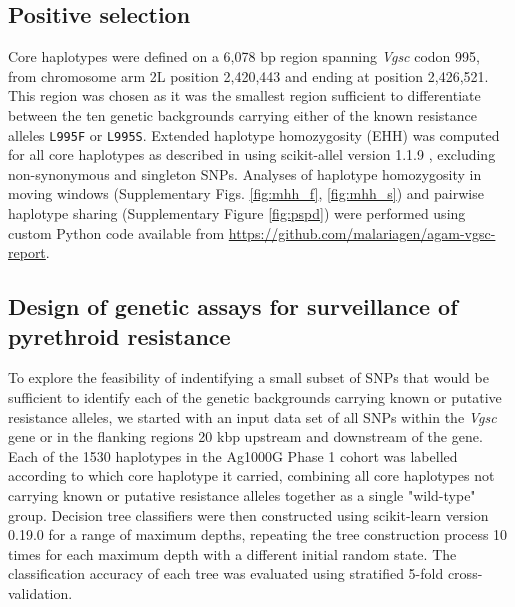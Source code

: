 \documentclass[a4paper,11pt,abstracton,hidelinks]{scrartcl}
\begin{document}
\subsection*{Positive selection}

Core haplotypes were defined on a 6,078 bp region spanning \textit{Vgsc} codon 995, from chromosome arm 2L position 2,420,443 and ending at position 2,426,521.
%
This region was chosen as it was the smallest region sufficient to differentiate between the ten genetic backgrounds carrying either of the known resistance alleles \texttt{L995F} or \texttt{L995S}.
%
Extended haplotype homozygosity (EHH) was computed for all core haplotypes as described in \cite{Sabeti2002} using scikit-allel version 1.1.9 \cite{Miles2016}, excluding non-synonymous and singleton SNPs.
%
Analyses of haplotype homozygosity in moving windows (Supplementary Figs. \ref{fig:mhh_f}, \ref{fig:mhh_s}) and pairwise haplotype sharing (Supplementary Figure \ref{fig:pspd}) were performed using custom Python code available from \url{https://github.com/malariagen/agam-vgsc-report}.
%

\subsection*{Design of genetic assays for surveillance of pyrethroid resistance}

To explore the feasibility of indentifying a small subset of SNPs that would be sufficient to identify each of the genetic backgrounds carrying known or putative resistance alleles, we started with an input data set of all SNPs within the \textit{Vgsc} gene or in the flanking regions 20 kbp upstream and downstream of the gene.
%
Each of the 1530 haplotypes in the Ag1000G Phase 1 cohort was labelled according to which core haplotype it carried, combining all core haplotypes not carrying known or putative resistance alleles together as a single "wild-type" group.
%
Decision tree classifiers were then constructed using scikit-learn version 0.19.0 \cite{Pedregosa2011} for a range of maximum depths, repeating the tree construction process 10 times for each maximum depth with a different initial random state.
%
The classification accuracy of each tree was evaluated using stratified 5-fold cross-validation.
%


\printbibliography
\end{document}
